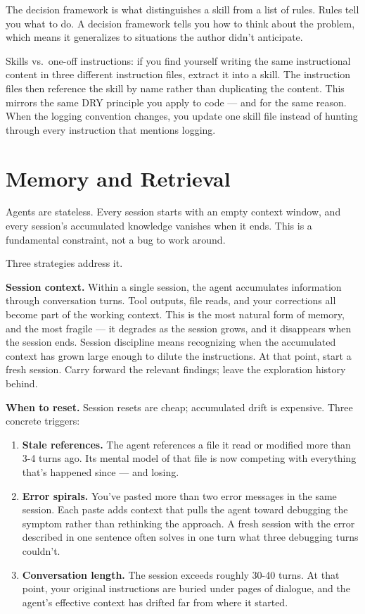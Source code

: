\documentclass[
  a4paper,
  DIV=11,
  numbers=noendperiod]{scrreprt}
\providecommand{\tightlist}{%
  \setlength{\itemsep}{0pt}\setlength{\parskip}{0pt}}
\begin{document}
The decision framework is what distinguishes a skill from a list of
rules. Rules tell you what to do. A decision framework tells you how to
think about the problem, which means it generalizes to situations the
author didn't anticipate.

Skills vs.~one-off instructions: if you find yourself writing the same
instructional content in three different instruction files, extract it
into a skill. The instruction files then reference the skill by name
rather than duplicating the content. This mirrors the same DRY principle
you apply to code --- and for the same reason. When the logging
convention changes, you update one skill file instead of hunting through
every instruction that mentions logging.

\section{Memory and Retrieval}\label{memory-and-retrieval}

Agents are stateless. Every session starts with an empty context window,
and every session's accumulated knowledge vanishes when it ends. This is
a fundamental constraint, not a bug to work around.

Three strategies address it.

\textbf{Session context.} Within a single session, the agent accumulates
information through conversation turns. Tool outputs, file reads, and
your corrections all become part of the working context. This is the
most natural form of memory, and the most fragile --- it degrades as the
session grows, and it disappears when the session ends. Session
discipline means recognizing when the accumulated context has grown
large enough to dilute the instructions. At that point, start a fresh
session. Carry forward the relevant findings; leave the exploration
history behind.

\textbf{When to reset.} Session resets are cheap; accumulated drift is
expensive. Three concrete triggers:

\begin{enumerate}
\def\labelenumi{\arabic{enumi}.}
\tightlist
\item
  \textbf{Stale references.} The agent references a file it read or
  modified more than 3-4 turns ago. Its mental model of that file is now
  competing with everything that's happened since --- and losing.
\item
  \textbf{Error spirals.} You've pasted more than two error messages in
  the same session. Each paste adds context that pulls the agent toward
  debugging the symptom rather than rethinking the approach. A fresh
  session with the error described in one sentence often solves in one
  turn what three debugging turns couldn't.
\item
  \textbf{Conversation length.} The session exceeds roughly 30-40 turns.
  At that point, your original instructions are buried under pages of
  dialogue, and the agent's effective context has drifted far from where
  it started.
\end{enumerate}
\end{document}
